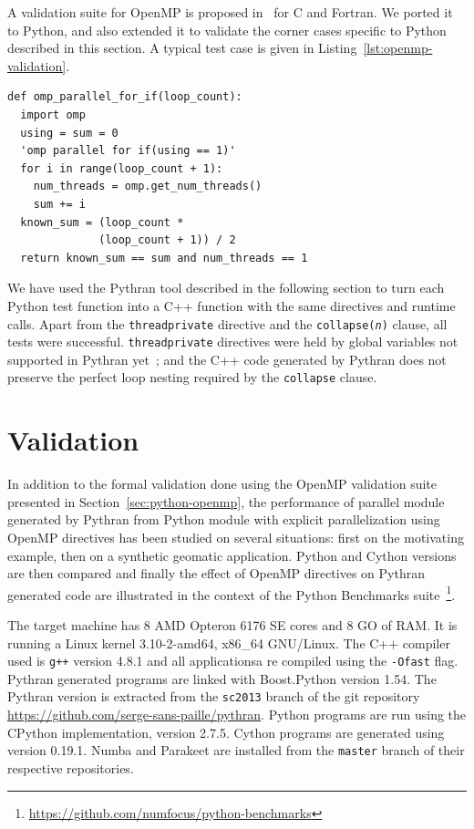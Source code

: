 \documentclass[conference]{IEEEtran}
\begin{document}
A validation suite for OpenMP is proposed in~\cite{wang2012} for C and Fortran.
We ported it to Python, and also extended it to validate the corner cases
specific to Python described in this section. A typical test case is given in
Listing~\ref{lst:openmp-validation}.

\begin{lstlisting}[float,label={lst:openmp-validation},caption={Example of Python
    OpenMP validation test case.}]
def omp_parallel_for_if(loop_count):
  import omp
  using = sum = 0
  'omp parallel for if(using == 1)'
  for i in range(loop_count + 1):
    num_threads = omp.get_num_threads()
    sum += i
  known_sum = (loop_count *
              (loop_count + 1)) / 2
  return known_sum == sum and num_threads == 1
\end{lstlisting}

We have used the Pythran tool described in the following section to turn each
Python test function into a C++ function with the same directives and runtime
calls. Apart from the \texttt{threadprivate} directive and the
\texttt{collapse(\emph{n})} clause, all tests were successful.
\texttt{threadprivate} directives were held by global variables not supported in
Pythran yet~; and the C++ code generated by Pythran does not preserve the perfect
loop nesting required by the \texttt{collapse} clause.

\section{Validation}\label{sec:validation}

In addition to the formal validation done using the OpenMP validation suite
presented in Section~\ref{sec:python-openmp}, the performance of parallel module
generated by Pythran from Python module with explicit parallelization using
OpenMP directives has been studied on several situations: first on the
motivating example, then on a synthetic geomatic application. Python and Cython
versions are then compared and finally the effect of OpenMP directives on Pythran
generated code are illustrated in the context of the Python Benchmarks
suite~\footnote{\url{https://github.com/numfocus/python-benchmarks}}.

The target machine has  8 AMD Opteron 6176 SE cores and 8 GO of RAM. It is
running a Linux kernel 3.10-2-amd64, x86\_64 GNU/Linux. The C++ compiler used is
\texttt{g++} version 4.8.1 and all applicationsa re compiled using the
\texttt{-Ofast} flag. Pythran generated programs are linked with Boost.Python
version 1.54. The Pythran version is extracted from the \texttt{sc2013} branch
of the git repository \url{https://github.com/serge-sans-paille/pythran}. Python
programs are run using the CPython implementation, version 2.7.5. Cython
programs are generated using version 0.19.1. Numba and Parakeet are installed
from the \texttt{master} branch of their respective repositories.
\end{document}
